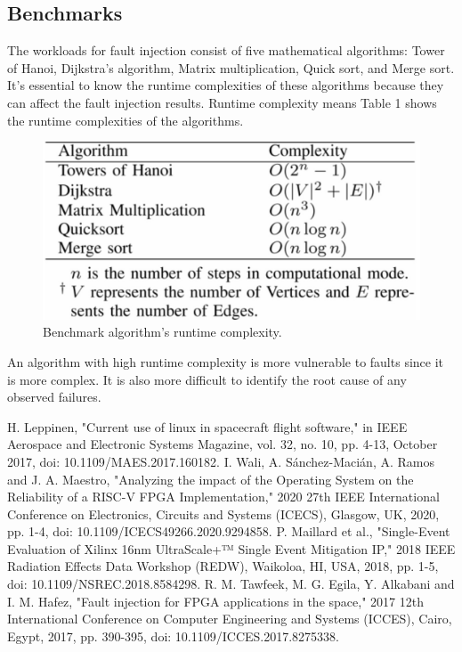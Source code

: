\documentclass[conference]{IEEEtran}
\begin{document}
\subsection{Benchmarks}
The workloads for fault injection consist of five mathematical algorithms: Tower of Hanoi, Dijkstra's algorithm, Matrix multiplication, 
Quick sort, and Merge sort. It's essential to know the runtime complexities of these algorithms because they can affect the fault 
injection results. Runtime complexity means Table 1 shows the runtime complexities of the algorithms. 
\begin{figure}[h]
    \centering
    \includegraphics[scale = 0.2]{runtime.jpg}
    \caption{Benchmark algorithm's runtime complexity.}
\end{figure}

An algorithm with high runtime complexity is more vulnerable to faults since it is more complex. It is also 
more difficult to identify the root cause of any observed failures.





\begin{thebibliography}{10}
     H. Leppinen, "Current use of linux in spacecraft flight software," in IEEE Aerospace and Electronic Systems Magazine,
     vol. 32, no. 10, pp. 4-13, October 2017, doi: 10.1109/MAES.2017.160182. 
     I. Wali, A. Sánchez-Macián, A. Ramos and J. A. Maestro, "Analyzing the impact of the Operating System on the Reliability
     of a RISC-V FPGA Implementation," 2020 27th IEEE International Conference on Electronics, Circuits and Systems (ICECS), Glasgow, UK, 2020,
    pp. 1-4, doi: 10.1109/ICECS49266.2020.9294858.
     P. Maillard et al., "Single-Event Evaluation of Xilinx 16nm UltraScale+™ Single Event Mitigation IP," 2018 IEEE Radiation 
     Effects Data Workshop (REDW), Waikoloa, HI, USA, 2018, pp. 1-5, doi: 10.1109/NSREC.2018.8584298.
     R. M. Tawfeek, M. G. Egila, Y. Alkabani and I. M. Hafez, "Fault injection for FPGA applications in the space," 2017 12th
     International Conference on Computer Engineering and Systems (ICCES), Cairo, Egypt, 2017, pp. 390-395, doi: 10.1109/ICCES.2017.8275338.
     
    
\end{thebibliography}
\end{document}
